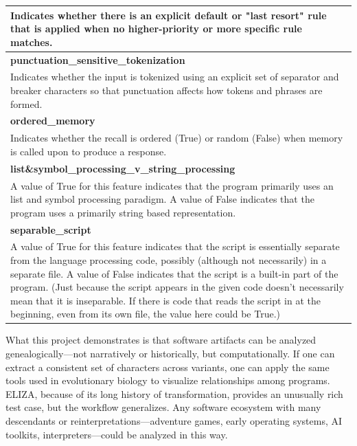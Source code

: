 \documentclass{article}
\begin{document}
\begin{table}[htbp]
\begin{tabular}{|p{}|}
Indicates whether there is an explicit default or "last resort" rule that is applied when no higher-priority or more specific rule matches. \\
\hline\hline
\textbf{punctuation\_sensitive\_tokenization} \\
Indicates whether the input is tokenized using an explicit set of separator and breaker characters so that punctuation affects how tokens and phrases are formed. \\
\hline\hline
\textbf{ordered\_memory} \\
Indicates whether the recall is ordered (True) or random (False) when memory is called upon to produce a response. \\
\hline\hline
\textbf{list\&symbol\_processing\_v\_string\_processing} \\
A value of True for this feature indicates that the program primarily uses an list and symbol processing paradigm. A value of False indicates that the program uses a primarily string based representation. \\
\hline\hline
\textbf{separable\_script} \\
A value of True for this feature indicates that the script is essentially separate from the language processing code, possibly (although not necessarily) in a separate file. A value of False indicates that the script is a built-in part of the program. (Just because the script appears in the given code doesn't necessarily mean that it is inseparable. If there is code that reads the script in at the beginning, even from its own file, the value here could be True.) \\
\hline
\end{tabular}
\end{table}




 
What this project demonstrates is that software artifacts can be analyzed genealogically—not narratively or historically, but computationally. If one can extract a consistent set of characters across variants, one can apply the same tools used in evolutionary biology to visualize relationships among programs. ELIZA, because of its long history of transformation, provides an unusually rich test case, but the workflow generalizes. Any software ecosystem with many descendants or reinterpretations—adventure games, early operating systems, AI toolkits, interpreters—could be analyzed in this way.
\end{document}
